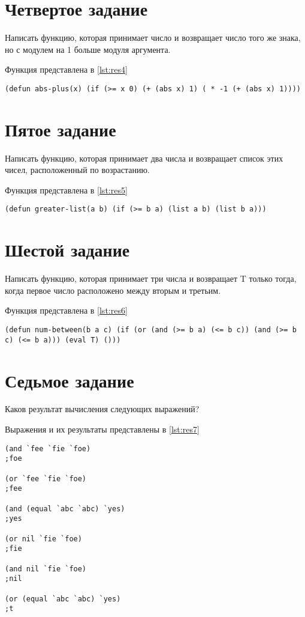 \section{ Четвертое задание}
Написать функцию, которая принимает число и возвращает число того же знака, но с модулем на 1 больше модуля аргумента.

Функция представлена в \ref{lst:res4}

\begin{lstlisting}[style=lispStyle, caption={ Представление функции.},
                    label={lst:res4}]
(defun abs-plus(x) (if (>= x 0) (+ (abs x) 1) ( * -1 (+ (abs x) 1))))
\end{lstlisting}

\section{ Пятое задание}
Написать функцию, которая принимает два числа и возвращает список этих чисел, расположенный по возрастанию.

Функция представлена в \ref{lst:res5}

\begin{lstlisting}[style=lispStyle, caption={ Представление функции.},
                    label={lst:res5}]
(defun greater-list(a b) (if (>= b a) (list a b) (list b a)))
\end{lstlisting}

\section{ Шестой задание}
Написать функцию, которая принимает три числа и возвращает T только тогда, когда первое число расположено между вторым и третьим.

Функция представлена в \ref{lst:res6}

\begin{lstlisting}[style=lispStyle, caption={ Представление функции.},
                    label={lst:res6}]
(defun num-between(b a c) (if (or (and (>= b a) (<= b c)) (and (>= b c) (<= b a))) (eval T) ()))
\end{lstlisting}

\section{ Седьмое задание}
Каков результат вычисления следующих выражений?

Выражения и их результаты представлены в \ref{lst:res7}

\begin{lstlisting}[style=lispStyle, caption={ Выражения и их результаты.},
                    label={lst:res7}]
(and `fee `fie `foe)
;foe

(or `fee `fie `foe)
;fee

(and (equal `abc `abc) `yes)
;yes

(or nil `fie `foe)
;fie

(and nil `fie `foe)
;nil

(or (equal `abc `abc) `yes)
;t
\end{lstlisting}
